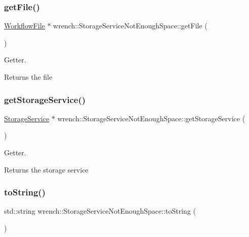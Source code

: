 \subsubsection{\texorpdfstring{get\+File()}{getFile()}}
{\footnotesize\ttfamily \hyperlink{classwrench_1_1_workflow_file}{Workflow\+File} $\ast$ wrench\+::\+Storage\+Service\+Not\+Enough\+Space\+::get\+File (\begin{DoxyParamCaption}{ }\end{DoxyParamCaption})}



Getter. 

\begin{DoxyReturn}{Returns}
the file 
\end{DoxyReturn}
\mbox{\label{classwrench_1_1_storage_service_not_enough_space_a1c480ac68fe40aadd348999d1069c5d0}} 
\subsubsection{\texorpdfstring{get\+Storage\+Service()}{getStorageService()}}
{\footnotesize\ttfamily \hyperlink{classwrench_1_1_storage_service}{Storage\+Service} $\ast$ wrench\+::\+Storage\+Service\+Not\+Enough\+Space\+::get\+Storage\+Service (\begin{DoxyParamCaption}{ }\end{DoxyParamCaption})}



Getter. 

\begin{DoxyReturn}{Returns}
the storage service 
\end{DoxyReturn}
\mbox{\label{classwrench_1_1_storage_service_not_enough_space_a42680e32c21db44888e173d6a0358326}} 
\subsubsection{\texorpdfstring{to\+String()}{toString()}}
{\footnotesize\ttfamily std\+::string wrench\+::\+Storage\+Service\+Not\+Enough\+Space\+::to\+String (\begin{DoxyParamCaption}{ }\end{DoxyParamCaption})\hspace{0.3cm}{\ttfamily [virtual]}}



